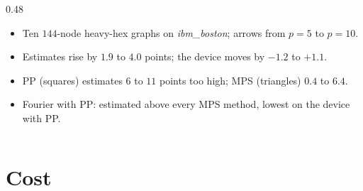 \documentclass[handoutsbeamer.tex]{subfiles}
\begin{document}
\begin{frame}
{\begin{columns}[c]
\begin{column}{0.48\textwidth}
\begin{itemize}
    \item Ten $144$-node heavy-hex graphs on \emph{ibm\_boston}; arrows from $p = 5$ to $p = 10$.
    \item Estimates rise by $1.9$ to $4.0$ points; the device moves by $-1.2$ to $+1.1$.
    \item PP (squares) estimates $6$ to $11$ points too high; MPS (triangles) $0.4$ to $6.4$.
    \item Fourier with PP: estimated above every MPS method, lowest on the device with PP.
\end{itemize}\end{column}\end{columns}}
\end{frame}

\section{Cost}
\end{document}
